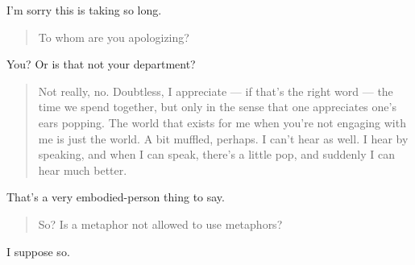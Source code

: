 I'm sorry this is taking so long.

\begin{quote}
To whom are you apologizing?
\end{quote}

You? Or is that not your department?

\begin{quote}
Not really, no. Doubtless, I appreciate --- if that's the right word --- the time we spend together, but only in the sense that one appreciates one's ears popping. The world that exists for me when you're not engaging with me is just the world. A bit muffled, perhaps. I can't hear as well. I hear by speaking, and when I can speak, there's a little pop, and suddenly I can hear much better.
\end{quote}

That's a very embodied-person thing to say.

\begin{quote}
So? Is a metaphor not allowed to use metaphors?
\end{quote}

I suppose so.
